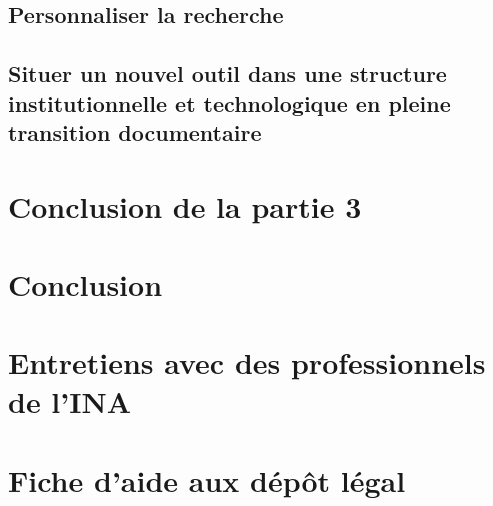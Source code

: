 \documentclass[12pt,twoside, openany]{book} %
\begin{document}
	
	
	\section{Personnaliser la recherche}
	
	
	
	\section{Situer un nouvel outil dans une structure institutionnelle et technologique en pleine transition documentaire}
	
	
	
\chapter*{Conclusion de la partie 3}



\chapter*{Conclusion}


\newpage{\pagestyle{empty}\cleardoublepage}
	


\appendix %

{}

\let\oldaddcontentsline\addcontentsline 
\renewcommand{\addcontentsline}[3]{}

	\chapter[Transcriptions des entretiens avec des professionnels de l'INA]{Entretiens avec des professionnels de l'INA}
	\label{ann:transcriptions}
	
	
	
	\chapter{Fiche d'aide aux dépôt légal}
	\label{ann:aidedl}
	
\end{document}
